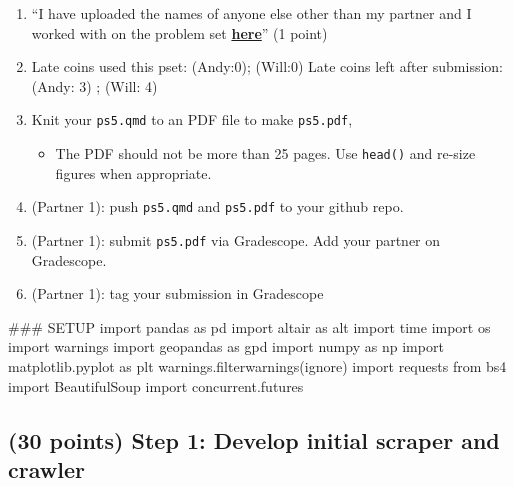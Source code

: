 \documentclass[
  letterpaper,
  DIV=11,
  numbers=noendperiod]{scrartcl}
\newenvironment{Shaded}{\begin{snugshade}}{\end{snugshade}}
\newcommand{\CommentTok}[1]{\textcolor[rgb]{0.37,0.37,0.37}{#1}}
\newcommand{\ImportTok}[1]{\textcolor[rgb]{0.00,0.46,0.62}{#1}}
\newcommand{\NormalTok}[1]{\textcolor[rgb]{0.00,0.23,0.31}{#1}}
\newcommand{\StringTok}[1]{\textcolor[rgb]{0.13,0.47,0.30}{#1}}
\providecommand{\tightlist}{%
  \setlength{\itemsep}{0pt}\setlength{\parskip}{0pt}}\usepackage{longtable,booktabs,array}
\begin{document}
\begin{enumerate}
\def\labelenumi{\arabic{enumi}.}
\setcounter{enumi}{4}
\tightlist
\item
  ``I have uploaded the names of anyone else other than my partner and I
  worked with on the problem set
  \textbf{\href{https://docs.google.com/forms/d/185usrCREQaUbvAXpWhChkjghdGgmAZXA3lPWpXLLsts/edit}{here}}''
  (1 point)
\item
  Late coins used this pset: (Andy:0); (Will:0) Late coins left after
  submission: (Andy: 3) ; (Will: 4)
\item
  Knit your \texttt{ps5.qmd} to an PDF file to make \texttt{ps5.pdf},

  \begin{itemize}
  \tightlist
  \item
    The PDF should not be more than 25 pages. Use \texttt{head()} and
    re-size figures when appropriate.
  \end{itemize}
\item
  (Partner 1): push \texttt{ps5.qmd} and \texttt{ps5.pdf} to your github
  repo.
\item
  (Partner 1): submit \texttt{ps5.pdf} via Gradescope. Add your partner
  on Gradescope.
\item
  (Partner 1): tag your submission in Gradescope
\end{enumerate}

\begin{Shaded}
\begin{Highlighting}[]
\CommentTok{\#\#\# SETUP }
\ImportTok{import}\NormalTok{ pandas }\ImportTok{as}\NormalTok{ pd}
\ImportTok{import}\NormalTok{ altair }\ImportTok{as}\NormalTok{ alt}
\ImportTok{import}\NormalTok{ time}
\ImportTok{import}\NormalTok{ os}
\ImportTok{import}\NormalTok{ warnings}
\ImportTok{import}\NormalTok{ geopandas }\ImportTok{as}\NormalTok{ gpd}
\ImportTok{import}\NormalTok{ numpy }\ImportTok{as}\NormalTok{ np}
\ImportTok{import}\NormalTok{ matplotlib.pyplot }\ImportTok{as}\NormalTok{ plt}
\NormalTok{warnings.filterwarnings(}\StringTok{\textquotesingle{}ignore\textquotesingle{}}\NormalTok{)}
\ImportTok{import}\NormalTok{ requests}
\ImportTok{from}\NormalTok{ bs4 }\ImportTok{import}\NormalTok{ BeautifulSoup}
\ImportTok{import}\NormalTok{ concurrent.futures}
\end{Highlighting}
\end{Shaded}

\subsection{(30 points) Step 1: Develop initial scraper and
crawler}\label{points-step-1-develop-initial-scraper-and-crawler}
\end{document}

